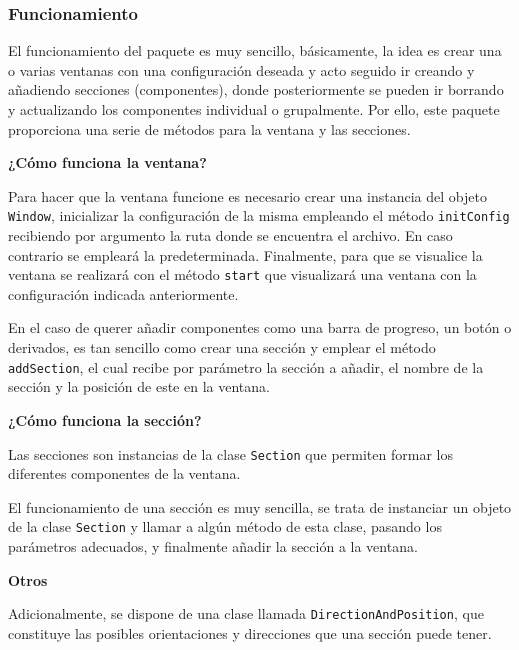 \subsubsection{Funcionamiento}

El funcionamiento del paquete es muy sencillo, básicamente, la idea es crear una o varias ventanas con una configuración deseada y acto seguido ir creando y añadiendo secciones (componentes), donde posteriormente se pueden ir borrando y actualizando los componentes individual o grupalmente. Por ello, este paquete proporciona una serie de métodos para la ventana y las secciones.\bigskip

\noindent\textbf{¿Cómo funciona la ventana?}\bigskip

Para hacer que la ventana funcione es necesario crear una instancia del objeto \texttt{Window}, inicializar la configuración de la misma empleando el método \texttt{initConfig} recibiendo por argumento la ruta donde se encuentra el archivo. En caso contrario se empleará la predeterminada. Finalmente, para que se visualice la ventana se realizará con el método \texttt{start} que visualizará una ventana con la configuración indicada anteriormente.\bigskip

En el caso de querer añadir componentes como una barra de progreso, un botón o derivados, es tan sencillo como crear una sección y emplear el método \texttt{addSection}, el cual recibe por parámetro la sección a añadir, el nombre de la sección y la posición de este en la ventana.\bigskip

\noindent\textbf{¿Cómo funciona la sección?}\bigskip

Las secciones son instancias de la clase \texttt{Section} que permiten formar los diferentes componentes de la ventana.\bigskip

El funcionamiento de una sección es muy sencilla, se trata de instanciar un objeto de la clase \texttt{Section} y llamar a algún método de esta clase, pasando los parámetros adecuados, y finalmente añadir la sección a la ventana.\bigskip

\noindent\textbf{Otros}\bigskip

Adicionalmente, se dispone de una clase llamada \texttt{DirectionAndPosition}, que constituye las posibles orientaciones y direcciones que una sección puede tener.

